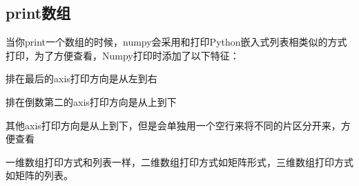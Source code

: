 \subsection{print数组}
当你print一个数组的时候，numpy会采用和打印Python嵌入式列表相类似的方式打印，为了方便查看，Numpy打印时添加了以下特征：
\begin{compactitem}
	\item 排在最后的axis打印方向是从左到右
	\item 排在倒数第二的axis打印方向是从上到下
	\item 其他axis打印方向是从上到下，但是会单独用一个空行来将不同的片区分开来，方便查看
\end{compactitem}

一维数组打印方式和列表一样，二维数组打印方式如矩阵形式，三维数组打印方式如矩阵的列表。

